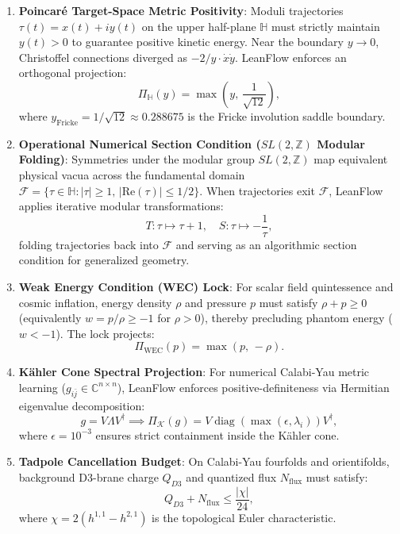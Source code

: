 \documentclass[11pt,a4paper]{article}
\begin{document}
\begin{enumerate}
    \item \textbf{Poincaré Target-Space Metric Positivity}: Moduli trajectories $\tau(t) = x(t) + i y(t)$ on the upper half-plane $\mathbb{H}$ must strictly maintain $y(t) > 0$ to guarantee positive kinetic energy. Near the boundary $y \to 0$, Christoffel connections diverged as $-2/y \cdot \dot{x}\dot{y}$. LeanFlow enforces an orthogonal projection:
    \begin{equation}
        \Pi_{\mathbb{H}}(y) = \max\left(y, \, \frac{1}{\sqrt{12}}\right),
    \end{equation}
    where $y_{\text{Fricke}} = 1/\sqrt{12} \approx 0.288675$ is the Fricke involution saddle boundary.

    \item \textbf{Operational Numerical Section Condition ($SL(2, \mathbb{Z})$ Modular Folding)}: Symmetries under the modular group $SL(2, \mathbb{Z})$ map equivalent physical vacua across the fundamental domain $\mathcal{F} = \{ \tau \in \mathbb{H} : |\tau| \ge 1, \, |\text{Re}(\tau)| \le 1/2 \}$. When trajectories exit $\mathcal{F}$, LeanFlow applies iterative modular transformations:
    \begin{equation}
        T: \tau \mapsto \tau + 1, \quad S: \tau \mapsto -\frac{1}{\tau},
    \end{equation}
    folding trajectories back into $\mathcal{F}$ and serving as an algorithmic section condition for generalized geometry.

    \item \textbf{Weak Energy Condition (WEC) Lock}: For scalar field quintessence and cosmic inflation, energy density $\rho$ and pressure $p$ must satisfy $\rho + p \ge 0$ (equivalently $w = p/\rho \ge -1$ for $\rho > 0$), thereby precluding phantom energy ($w < -1$). The lock projects:
    \begin{equation}
        \Pi_{\text{WEC}}(p) = \max(p, \, -\rho).
    \end{equation}

    \item \textbf{Kähler Cone Spectral Projection}: For numerical Calabi-Yau metric learning ($g_{i\bar{j}} \in \mathbb{C}^{n \times n}$), LeanFlow enforces positive-definiteness via Hermitian eigenvalue decomposition:
    \begin{equation}
        g = V \Lambda V^\dagger \implies \Pi_{\mathcal{K}}(g) = V \operatorname{diag}(\max(\epsilon, \lambda_i)) V^\dagger,
    \end{equation}
    where $\epsilon = 10^{-3}$ ensures strict containment inside the Kähler cone.

    \item \textbf{Tadpole Cancellation Budget}: On Calabi-Yau fourfolds and orientifolds, background D3-brane charge $Q_{D3}$ and quantized flux $N_{\text{flux}}$ must satisfy:
    \begin{equation}
        Q_{D3} + N_{\text{flux}} \le \frac{|\chi|}{24},
    \end{equation}
    where $\chi = 2(h^{1,1} - h^{2,1})$ is the topological Euler characteristic.
\end{enumerate}
\end{document}
